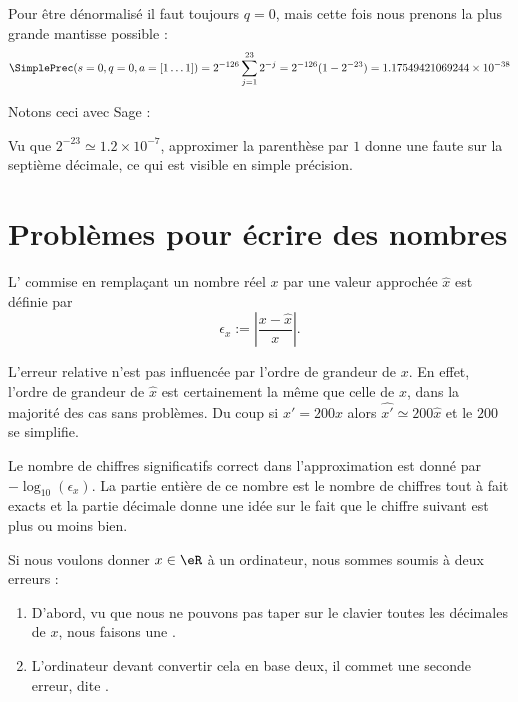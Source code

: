 \begin{example}      \label{EXEMooRHENooGwumoA}
	Pour être dénormalisé il faut toujours \( q=0\), mais cette fois nous prenons la plus grande mantisse possible :
	\begin{equation}
		\SimplePrec(s=0,q=0,a=[1\ldots 1])=2^{-126}\sum_{j=1}^{23}2^{-j}=2^{-126}(1-2^{-23})= 1.17549421069244\times 10^{-38}
	\end{equation}
\end{example}

Notons ceci avec Sage :


Vu que \( 2^{-23}\simeq 1.2\times 10^{-7}\), approximer la parenthèse par \( 1\) donne une faute sur la septième décimale, ce qui est visible en simple précision.

\section{Problèmes pour écrire des nombres}

\begin{definition}
	L' commise en remplaçant un nombre réel \( x\) par une valeur approchée \( \hat{x}\) est définie par
	\begin{equation}
		\epsilon_x:=\left|\frac{x-\hat{x}}{x}\right|.
	\end{equation}
\end{definition}

L'erreur relative n'est pas influencée par l'ordre de grandeur de \( x\). En effet, l'ordre de grandeur de \( \hat x\) est certainement la même que celle de \( x\), dans la majorité des cas sans problèmes. Du coup si \( x'=200x\) alors \( \hat{x'}\simeq 200\hat{x}\) et le \( 200\) se simplifie.

Le nombre de chiffres significatifs correct dans l'approximation est donné par \( -\log_{10}(\epsilon_x)\). La partie entière de ce nombre est le nombre de chiffres tout à fait exacts et la partie décimale donne une idée sur le fait que le chiffre suivant est plus ou moins bien.


\begin{remark}
	Si nous voulons donner \( x\in \eR\) à un ordinateur, nous sommes soumis à deux erreurs :
	\begin{enumerate}
		\item
		      D'abord, vu que nous ne pouvons pas taper sur le clavier toutes les décimales de \( x\), nous faisons une .
		\item
		      L'ordinateur devant convertir cela en base deux, il commet une seconde erreur, dite .
	\end{enumerate}
\end{remark}

